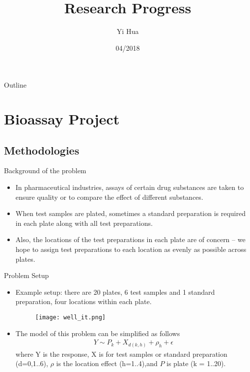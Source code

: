 \documentclass{beamer}
\title{Research Progress  }
\author{Yi Hua  }
\date{04/2018}
\begin{document}
\begin{frame}
\titlepage
\end{frame}


\begin{frame}{Outline}
  \tableofcontents
\end{frame}

\section{Bioassay Project}
\subsection{Methodologies}


\begin{frame}{Background of the problem}
\begin{itemize}
    \item In pharmaceutical industries, assays of certain drug substances are taken to ensure quality or to compare the effect of different substances. 
    \item When test samples are plated, sometimes a standard preparation is required in each plate along with all test preparations.
    \item Also, the locations of the test preparations in each plate are of concern -- we hope to assign test preparations to each location as evenly as possible across plates.
   \end{itemize}
    
\end{frame}

\begin{frame}{Problem Setup}
    \begin{itemize}
        \item Example setup: there are 20 plates, 6 test samples and 1 standard preparation, four locations within each plate.
        \begin{figure}
            \centering
            \texttt{[image: well\_it.png]}
            \label{fig:my_label}
        \end{figure}
             \item The model of this problem can be simplified as follows
       \begin{align}
    Y \sim P_{k} + X_{d(k,h)}+ \rho_{h}+\epsilon  
\end{align}
    where 
    Y is the response, X is for test samples or standard preparation (d=0,1..6), $\rho$ is the location effect (h=1..4),and $P$ is plate (k = 1..20).

    \end{itemize}
\end{frame}
\end{document}
